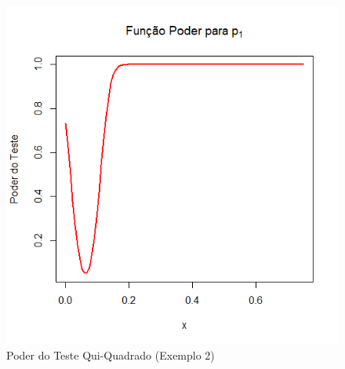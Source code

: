 \documentclass[12pt]{beamer}
\begin{document}
\begin{frame}{}
\begin{block}{}
\begin{figure}
    \centering
    \includegraphics[scale=0.5]{Aula13ChiSquareTests/figs/Ex2p1.png}
    \caption{Poder do Teste Qui-Quadrado (Exemplo 2)}
    \label{fig:enter-label}
\end{figure}
\end{block}
\end{frame}
\end{document}
